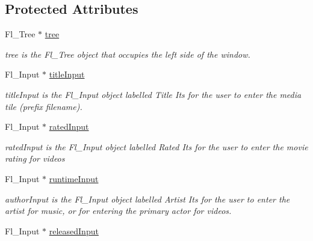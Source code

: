 \subsection*{Protected Attributes}
\begin{DoxyCompactItemize}
\item 
Fl\+\_\+\+Tree $\ast$ \hyperlink{class_movie_client_gui_af36267d1a841d6f1953abb2fd1549085}{tree}
\begin{DoxyCompactList}\small\item\em tree is the Fl\+\_\+\+Tree object that occupies the left side of the window. \end{DoxyCompactList}\item 
\hypertarget{class_movie_client_gui_a09459bc3627ba3f47a27df515d60eefb}{}Fl\+\_\+\+Input $\ast$ \hyperlink{class_movie_client_gui_a09459bc3627ba3f47a27df515d60eefb}{title\+Input}\label{class_movie_client_gui_a09459bc3627ba3f47a27df515d60eefb}

\begin{DoxyCompactList}\small\item\em title\+Input is the Fl\+\_\+\+Input object labelled Title Its for the user to enter the media tile (prefix filename). \end{DoxyCompactList}\item 
\hypertarget{class_movie_client_gui_a24100b71db9064b08ee16ba4ad2575ef}{}Fl\+\_\+\+Input $\ast$ \hyperlink{class_movie_client_gui_a24100b71db9064b08ee16ba4ad2575ef}{rated\+Input}\label{class_movie_client_gui_a24100b71db9064b08ee16ba4ad2575ef}

\begin{DoxyCompactList}\small\item\em rated\+Input is the Fl\+\_\+\+Input object labelled Rated Its for the user to enter the movie rating for videos \end{DoxyCompactList}\item 
\hypertarget{class_movie_client_gui_a612096ff4b484ca727cc6fbbb6e26526}{}Fl\+\_\+\+Input $\ast$ \hyperlink{class_movie_client_gui_a612096ff4b484ca727cc6fbbb6e26526}{runtime\+Input}\label{class_movie_client_gui_a612096ff4b484ca727cc6fbbb6e26526}

\begin{DoxyCompactList}\small\item\em author\+Input is the Fl\+\_\+\+Input object labelled Artist Its for the user to enter the artist for music, or for entering the primary actor for videos. \end{DoxyCompactList}\item 
\hypertarget{class_movie_client_gui_ae7c496133749474d8b1f0c37935ef6ea}{}Fl\+\_\+\+Input $\ast$ \hyperlink{class_movie_client_gui_ae7c496133749474d8b1f0c37935ef6ea}{released\+Input}\label{class_movie_client_gui_ae7c496133749474d8b1f0c37935ef6ea}


\end{DoxyCompactItemize}
